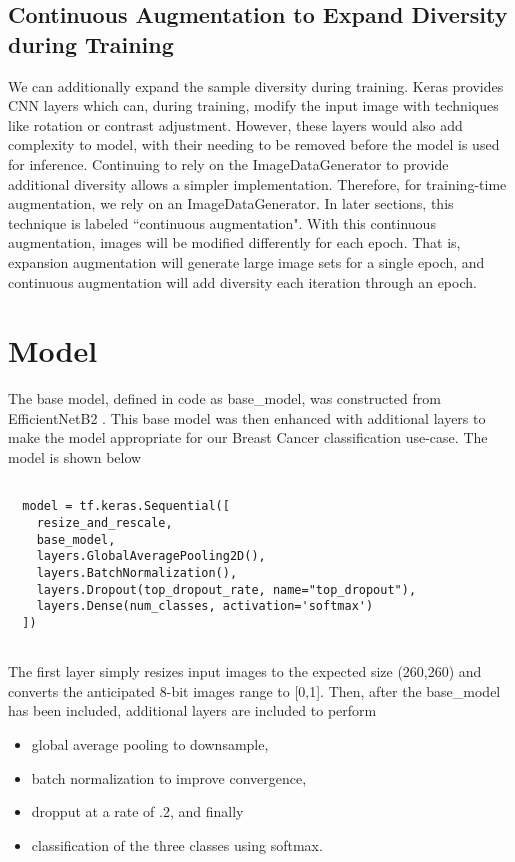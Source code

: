 \documentclass[sn-mathphys,Numbered]{sn-jnl}%
\theoremstyle{thmstyleone}%
\theoremstyle{thmstyletwo}%
\theoremstyle{thmstylethree}%
\begin{document}
\subsection{Continuous Augmentation to Expand Diversity during Training}
We can additionally expand the sample diversity during training.  Keras provides CNN layers which can, during training, modify the input image with techniques like rotation or contrast adjustment.  However, these layers would also add complexity to model, with their needing to be removed before the model is used for inference.  Continuing to rely on the ImageDataGenerator to provide additional diversity allows a simpler implementation.  Therefore, for training-time augmentation, we rely on an ImageDataGenerator. In later sections, this technique is labeled ``continuous augmentation".  With this continuous augmentation, images will be modified differently for each epoch.  That is, expansion augmentation will generate large image sets for a single epoch, and continuous augmentation will add diversity each iteration through an epoch.  

\section{Model}\label{sec_model}
The base model, defined in code as base\_model, was constructed from EfficientNetB2 \cite{effnet}.  This base model was then enhanced with additional layers to make the model appropriate for our Breast Cancer classification use-case.  The model is shown below
\begin{lstlisting}

  model = tf.keras.Sequential([
    resize_and_rescale,
    base_model,
    layers.GlobalAveragePooling2D(),
    layers.BatchNormalization(),
    layers.Dropout(top_dropout_rate, name="top_dropout"),
    layers.Dense(num_classes, activation='softmax')
  ])


\end{lstlisting}

The first layer simply resizes input images to the expected size (260,260) and converts the anticipated 8-bit images range to [0,1].  Then, after the base\_model has been included, additional layers are included to perform 
\begin{itemize}
\item global average pooling to downsample,
\item batch normalization to improve convergence,
\item dropput at a rate of .2, and finally
\item classification of the three classes using softmax.
\end{itemize}
\end{document}
